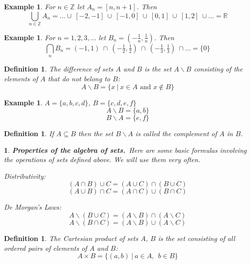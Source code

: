 \documentclass[11pt, letterpaper, oneside]{report}
\theoremstyle{pplain}
\newtheorem{ITERMVALUE THM}[theorem]{Intermediate Value Theorem}
\newtheorem{HEINEBOREL THM}[theorem]{Heine-Borel Theorem}
\newtheorem{UMETR THM}[theorem]{Urysohn Metrization Theorem}
\newtheorem{UMETR2 THM}[theorem]{Urysohn Metrization Theorem (v.2)}
\theoremstyle{ddefinition}
\newtheorem{definition}[theorem]{Definition}
\newtheorem{example}[theorem]{Example}
\theoremstyle{nnn}
\newtheorem{nn}[theorem]{}
\newtheorem{TDA NN}[theorem]{Topological Data Analysis. }
\theoremstyle{eexercise}
\newcommand{\Z}{{\mathbb Z}}
\newcommand{\R}{{\mathbb R}}
\newcommand{\ssmin}{\smallsetminus}
\begin{document}
\begin{example}
For $n\in \Z $ let $A_{n} = [n, n+1]$. Then 
$$\bigcup_{n\in \Z} A_{n} = {\dots} \cup \ [-2, -1]\  \cup\  [-1, 0]\  \cup\  [0, 1]\  \cup\  [1, 2]\ \cup {\dots} = \R$$ 
\end{example}



\begin{example}
For $n = 1, 2, 3, \dots $ let $B_{n} = (-\tfrac{1}{n}, \frac{1}{n})$. Then 
$$\bigcap_{n} B_{n} = (-1, 1)\ \cap\  (-\tfrac{1}{2}, \tfrac{1}{2})\  \cap\  (-\tfrac{1}{3}, \tfrac{1}{3})\  \cap {\dots} = \{ 0 \}$$
\end{example}


\begin{definition}
The \emph{difference} of sets $A$ and $B$ is the set $A\ssmin B$ consisting of the elements of $A$
that do not belong to $B$:
$$A\ssmin B = \{x\ | \ x\in A \text{ and } x\not\in B \}$$
\end{definition}

\begin{example} $A = \{a, b, c, d\}$, $B= \{c, d, e, f\}$
$$A\ssmin B = \{a, b\}$$
$$B\ssmin A = \{e, f \}$$
\end{example}


\begin{definition}
If $A\subseteq B$ then the set $B\ssmin A$ is called the \emph{complement} of $A$ in $B$. 
\end{definition}

\begin{nn}\textbf{Properties of the algebra of sets.}\ 
\label{SET ALG NN}
Here are some basic formulas involving the operations of sets defined above. We will use them very often. 

Distributivity:
$$(A\cap B)\cup C = (A\cup C)\cap (B\cup C)$$
$$(A\cup B)\cap C = (A\cap C)\cup (B\cap C)$$

De Morgan's Laws:
$$A\ssmin (B\cup C) = (A\ssmin B)\cap (A\ssmin C)$$
$$A\ssmin (B\cap C) = (A\ssmin B)\cup (A\ssmin C)$$
\end{nn}

\begin{definition}
The \emph{Cartesian product} of sets $A$, $B$ is the set consisting of all ordered 
pairs of elements of $A$ and $B$:
$$A\times B = \{(a, b) \ | \ a\in A, \ \ b\in B\}$$
\end{definition}
\end{document}
